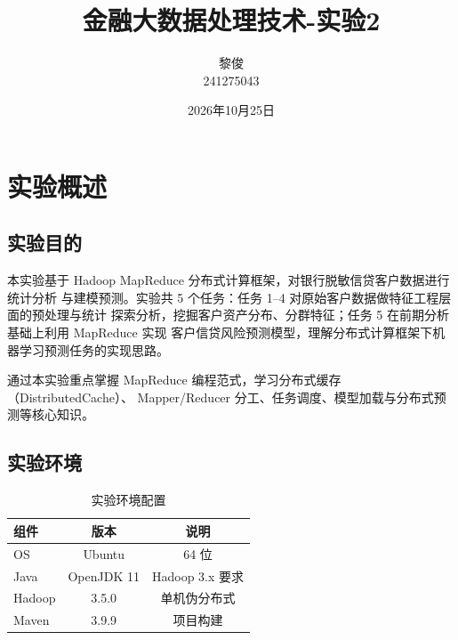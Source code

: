 \documentclass[UTF8,a4paper,12pt]{ctexart}
\title{\Large\bfseries 金融大数据处理技术-实验2}
\author{黎俊 \\ 241275043}
\date{2026年10月25日}
\begin{document}
\maketitle
\thispagestyle{empty}

\clearpage
{}
\tableofcontents
\thispagestyle{fancy}

\clearpage

\section{实验概述}

\subsection{实验目的}

本实验基于 Hadoop MapReduce 分布式计算框架，对银行脱敏信贷客户数据进行统计分析
与建模预测。实验共 5 个任务：任务 1--4 对原始客户数据做特征工程层面的预处理与统计
探索分析，挖掘客户资产分布、分群特征；任务 5 在前期分析基础上利用 MapReduce 实现
客户信贷风险预测模型，理解分布式计算框架下机器学习预测任务的实现思路。

通过本实验重点掌握 MapReduce 编程范式，学习分布式缓存（DistributedCache）、
Mapper/Reducer 分工、任务调度、模型加载与分布式预测等核心知识。

\subsection{实验环境}

\begin{table}[H]
  \centering
  \caption{实验环境配置}
  \label{tab:env}
  \begin{tabular}{lcc}
    \toprule
    组件 & 版本 & 说明 \\
    \midrule
    OS & Ubuntu & 64 位 \\
    Java & OpenJDK 11 & Hadoop 3.x 要求 \\
    Hadoop & 3.5.0 & 单机伪分布式 \\
    Maven & 3.9.9 & 项目构建 \\
    \bottomrule
  \end{tabular}
\end{table}
\end{document}
